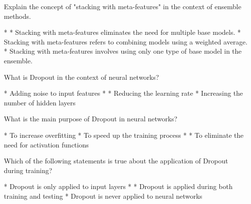 \documentclass[11pt]{extarticle}
\begin{document}
\begin{exercise}
    Explain the concept of "stacking with meta-features" in the context of ensemble methods.
    \begin{choice}
        * 
        * Stacking with meta-features eliminates the need for multiple base models.
        * Stacking with meta-features refers to combining models using a weighted average.
        * Stacking with meta-features involves using only one type of base model in the ensemble.
    \end{choice}
\end{exercise}
\begin{solution}
\end{solution}

\begin{exercise}
    What is Dropout in the context of neural networks?
    \begin{choice}
        * Adding noise to input features
        * 
        * Reducing the learning rate
        * Increasing the number of hidden layers
    \end{choice}
\end{exercise}
\begin{solution}
\end{solution}

\begin{exercise}
    What is the main purpose of Dropout in neural networks?
    \begin{choice}
        * To increase overfitting
        * To speed up the training process
        * 
        * To eliminate the need for activation functions
    \end{choice}
\end{exercise}
\begin{solution}
\end{solution}

\begin{exercise}
    Which of the following statements is true about the application of Dropout during training?
    \begin{choice}
        * Dropout is only applied to input layers
        * 
        * Dropout is applied during both training and testing
        * Dropout is never applied to neural networks
    \end{choice}
\end{exercise}
\begin{solution}
\end{solution}
\end{document}
